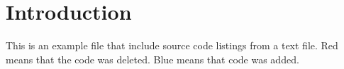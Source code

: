 \section{Introduction} %
\label{sec:introduction}
This is an example file that include source code listings from a text file.  Red means that the code was deleted.  Blue means that code was added.
